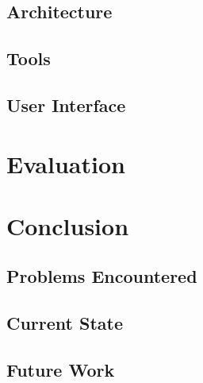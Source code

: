 \documentclass{l4proj}
\begin{document}
\section{Architecture}

\section{Tools}

\section{User Interface}


\chapter{Evaluation}


\chapter{Conclusion}
\section{Problems Encountered}

\section{Current State}

\section{Future Work}



\end{document}
